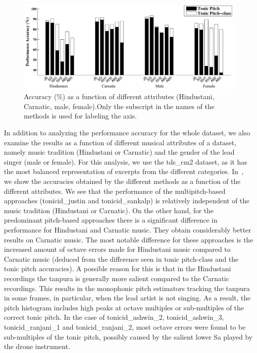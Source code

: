{\begin{figure}
	\begin{center}
		\includegraphics[width=\figSizeHundred]{ch05_preprocessing/figures/Category_Performance.pdf}
	\end{center}
	\caption[Tonic identification accuracies for Hindustani, Carnatic, male and female excerpts]{Accuracy (\%) as a function of different attributes (Hindustani, Carnatic, male, female).Only the subscript in the names of the methods is used for labeling the axis.}
	\label{fig:tonic_id_categorywise_performance}
\end{figure}

In addition to analyzing the performance accuracy for the whole dataset, we also examine the results as a function of different musical attributes of a dataset, namely music tradition (Hindustani or Carnatic) and the gender of the lead singer (male or female). For this analysis, we use the \acrshort{tds_cm2} dataset, as it has the most balanced representation of excerpts from the different categories. In~, we show the accuracies obtained by the different methods as a function of the different attributes. We see that the performance of the multipitch-based approaches (\acrshort{tonicid_justin} and \acrshort{tonicid_sankalp}) is relatively independent of the music tradition (Hindustani or Carnatic). On the other hand, for the predominant pitch-based approaches there is a significant difference in performance for Hindustani and Carnatic music. They obtain considerably better results on Carnatic music. The most notable difference for these approaches is the increased amount of octave errors made for Hindustani music compared to Carnatic music (deduced from the difference seen in tonic pitch-class and the tonic pitch accuracies). A possible reason for this is that in the Hindustani recordings the \gls{tanpura} is generally more salient compared to the Carnatic recordings. This results in the monophonic pitch estimators tracking the \gls{tanpura} in some frames, in particular, when the lead artist is not singing. As a result, the pitch histogram includes high peaks at octave multiples or sub-multiples of the correct tonic pitch. In the case of \acrshort{tonicid_ashwin_2}, \acrshort{tonicid_ashwin_3}, \acrshort{tonicid_ranjani_1} and \acrshort{tonicid_ranjani_2}, most octave errors were found to be sub-multiples of the tonic pitch, possibly caused by the salient lower Sa played by the drone instrument.

}
